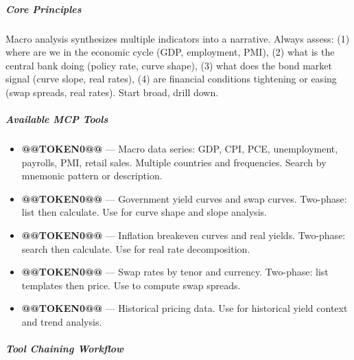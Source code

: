 \documentclass[11pt]{article}
\begin{document}
\subparagraph{Core Principles}\mbox{}\par

Macro analysis synthesizes multiple indicators into a narrative. Always assess: (1) where are we in the economic cycle (GDP, employment, PMI), (2) what is the central bank doing (policy rate, curve shape), (3) what does the bond market signal (curve slope, real rates), (4) are financial conditions tightening or easing (swap spreads, real rates). Start broad, drill down.


\subparagraph{Available MCP Tools}\mbox{}\par

\begin{itemize}[leftmargin=*,itemsep=2pt,topsep=2pt]
\item {} \textbf{@@TOKEN0@@} — Macro data series: GDP, CPI, PCE, unemployment, payrolls, PMI, retail sales. Multiple countries and frequencies. Search by mnemonic pattern or description.
\item {} \textbf{@@TOKEN0@@} — Government yield curves and swap curves. Two-phase: list then calculate. Use for curve shape and slope analysis.
\item {} \textbf{@@TOKEN0@@} — Inflation breakeven curves and real yields. Two-phase: search then calculate. Use for real rate decomposition.
\item {} \textbf{@@TOKEN0@@} — Swap rates by tenor and currency. Two-phase: list templates then price. Use to compute swap spreads.
\item {} \textbf{@@TOKEN0@@} — Historical pricing data. Use for historical yield context and trend analysis.
\end{itemize}

\subparagraph{Tool Chaining Workflow}\mbox{}\par
\end{document}
